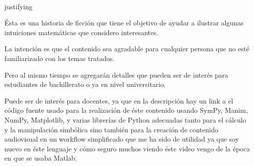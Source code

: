 \documentclass[preview]{standalone}
\begin{document}
\begin{center}
\quad\\justifying{

Ésta es una historia de ficción que tiene el objetivo de ayudar a ilustrar algunas intuiciones matemáticas que considero interesantes. 

La intención es que el contenido sea agradable para cualquier persona que no esté familiarizado con los temas tratados.  

Pero al mismo tiempo se agregarán detalles que pueden ser de interés para estudiantes de bachillerato o ya en nivel universitario. 

Puede ser de interés para docentes, ya que en la descripción hay un link a el código fuente usado para la realización de éste contenido usando SymPy, Manim, NumPy, Matplotlib, y varias librerías de Python adecuadas tanto para el cálculo y la manipulación simbólica sino también para la creación de contenido audiovisual en un workflow simplificado que me ha sido de utilidad ya que  soy nuevo en éste lenguaje y cómo seguro muchos viendo éste video vengo de la época en que se usaba Matlab. 

}
\end{center}
\end{document}
